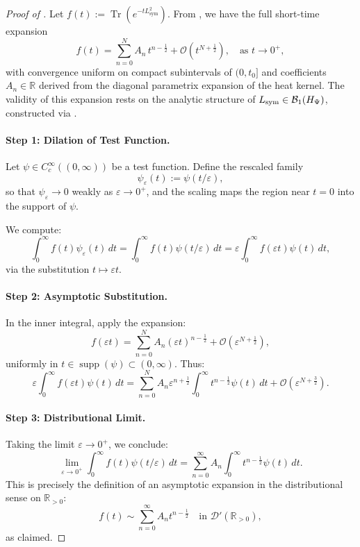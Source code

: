 \begin{proof}[Proof of ]
Let \( f(t) := \operatorname{Tr}(e^{-t L_{\mathrm{sym}}^2}) \). From , we have the full short-time expansion
\[
f(t) = \sum_{n=0}^N A_n \, t^{n - \frac{1}{2}} + \mathcal{O}(t^{N + \frac{1}{2}}), \quad \text{as } t \to 0^+,
\]
with convergence uniform on compact subintervals of \( (0, t_0] \) and coefficients \( A_n \in \mathbb{R} \) derived from the diagonal parametrix expansion of the heat kernel. The validity of this expansion rests on the analytic structure of \( L_{\mathrm{sym}} \in \mathcal{B}_1(H_{\Psi}) \), constructed via .

\paragraph{Step 1: Dilation of Test Function.}
Let \( \psi \in C_c^\infty((0, \infty)) \) be a test function. Define the rescaled family
\[
\psi_\varepsilon(t) := \psi(t/\varepsilon),
\]
so that \( \psi_\varepsilon \to 0 \) weakly as \( \varepsilon \to 0^+ \), and the scaling maps the region near \( t = 0 \) into the support of \( \psi \).

We compute:
\[
\int_0^\infty f(t) \psi_\varepsilon(t)\, dt
= \int_0^\infty f(t) \psi(t/\varepsilon)\, dt
= \varepsilon \int_0^\infty f(\varepsilon t) \psi(t)\, dt,
\]
via the substitution \( t \mapsto \varepsilon t \).

\paragraph{Step 2: Asymptotic Substitution.}
In the inner integral, apply the expansion:
\[
f(\varepsilon t) = \sum_{n=0}^N A_n (\varepsilon t)^{n - \frac{1}{2}} + \mathcal{O}(\varepsilon^{N + \frac{1}{2}}),
\]
uniformly in \( t \in \operatorname{supp}(\psi) \subset (0, \infty) \). Thus:
\[
\varepsilon \int_0^\infty f(\varepsilon t) \psi(t)\, dt
= \sum_{n=0}^N A_n \varepsilon^{n + \frac{1}{2}} \int_0^\infty t^{n - \frac{1}{2}} \psi(t)\, dt + \mathcal{O}(\varepsilon^{N + \frac{3}{2}}).
\]

\paragraph{Step 3: Distributional Limit.}
Taking the limit \( \varepsilon \to 0^+ \), we conclude:
\[
\lim_{\varepsilon \to 0^+} \int_0^\infty f(t) \psi(t/\varepsilon)\, dt
= \sum_{n=0}^\infty A_n \int_0^\infty t^{n - \frac{1}{2}} \psi(t)\, dt.
\]
This is precisely the definition of an asymptotic expansion in the distributional sense on \( \mathbb{R}_{>0} \):
\[
f(t) \sim \sum_{n=0}^\infty A_n t^{n - \frac{1}{2}} \quad \text{in } \mathcal{D}'(\mathbb{R}_{>0}),
\]
as claimed.
\end{proof}
